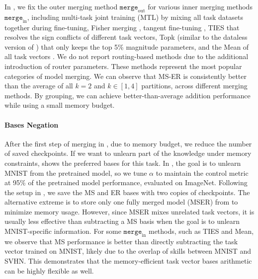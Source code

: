 In , we fix the outer merging method $\texttt{merge}_\text{out}$ for various inner merging methods $\texttt{merge}_\text{in}$, including multi-task joint training (MTL) by mixing all task datasets together during fine-tuning, Fisher merging \citep{matena2022merging}, tangent fine-tuning \citep{ortiz2024task}, TIES \citep{yadav2024ties} that resolves the sign conflicts of different task vectors, Topk (similar to the dataless version of \citet{he2024localize}) that only keeps the top 5\% magnitude parameters, and the Mean of all task vectors \citep{pmlr-v162-wortsman22a}. We do not report routing-based methods due to the additional introduction of router parameters. These methods represent the most popular categories of model merging. We can observe that MS-ER is consistently better than the average of all $k = 2$ and $k \in [1,4]$ partitions, across different merging methods. By grouping, we can achieve better-than-average addition performance while using a small memory budget.

\paragraph{Bases Negation} After the first step of merging in , due to memory budget, we reduce the number of saved checkpoints. If we want to unlearn part of the knowledge under memory constraints,  shows the preferred bases for this task. In , the goal is to unlearn MNIST from the pretrained model, so we tune $\alpha$ to maintain the control metric at 95\% of the pretrained model performance, evaluated on ImageNet. Following the setup in , we save the MS and ER bases with two copies of checkpoints. The alternative extreme is to store only one fully merged model (MSER) from  to minimize memory usage. However, since MSER mixes unrelated task vectors, it is usually less effective than subtracting a MS basis when the goal is to unlearn MNIST-specific information. For some $\texttt{merge}_\text{in}$ methods, such as TIES and Mean, we observe that MS performance is better than directly subtracting the task vector trained on MNIST, likely due to the overlap of skills between MNIST and SVHN. This demonstrates that the memory-efficient task vector bases arithmetic can be highly flexible as well.

